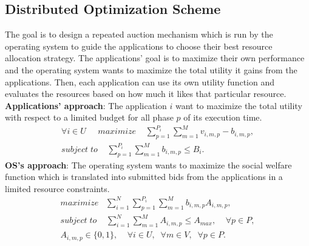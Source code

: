 \subsection{Distributed Optimization Scheme}
The goal is to design a repeated auction mechanism which is run by the operating system to guide the applications to choose their best resource allocation strategy. The applications' goal is to maximize their own performance and the operating system wants to maximize the total utility it gains from the applications. Then, each application can use its own utility function and evaluates the resources based on how much it likes that particular resource. \\
\indent \textbf{Applications' approach}: The application $i$ want to maximize the total utility with respect to a limited budget for all phase $p$ of its execution time. \\
\begin{align}
\forall i \in U \; \; \; \; \; maximize \; \; \; \; \sum\limits_{p=1}^{P_i} \sum\limits_{m=1}^M  v_{i,m,p}-b_{i,m,p} , \nonumber \\
subject \; to \;\;\;\; \sum\limits_{p=1}^{P_i} \sum\limits_{m=1}^M b_{i,m,p} \leq B_i .
\end{align}
\indent \textbf{OS's approach}: The operating system wants to maximize the social welfare function which is translated into submitted bids from the applications in a limited resource constraints.\\
\begin{align}
maximize \; \; \; \sum\limits_{i=1}^N \sum\limits_{p=1}^{P_i} \sum\limits_{m=1}^M b_{i,m,p} A_{i,m,p} , \nonumber \\ 
subject \; to \;\;\;\; \sum\limits_{i=1}^N \sum\limits_{m=1}^M A_{i,m,p} \leq A_{max}, \; \; \; \; \forall p \in P , \nonumber \\
A_{i,m,p} \in \{0,1\} , \; \; \; \; \forall i \in U, \; \;  \forall m \in V, \; \;  \forall p \in P .
\end{align}
